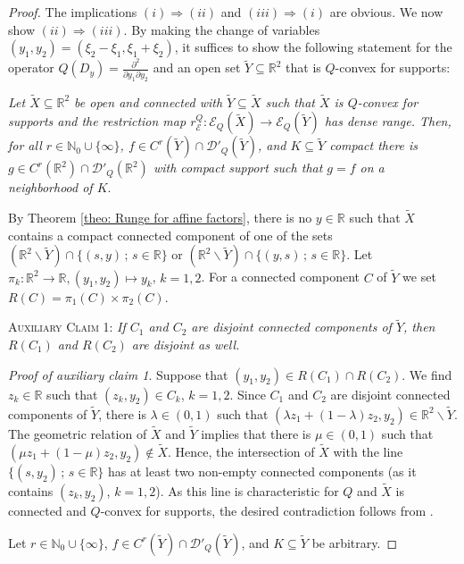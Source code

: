 \documentclass[12pt]{amsart}
\newcommand{\N}{\mathbb{N}}
\newcommand{\R}{\mathbb{R}}
\theoremstyle{definition}
\theoremstyle{remark}
\numberwithin{equation}{section}
\begin{document}
\begin{proof}
The implications $(i) \Rightarrow (ii)$ and $(iii) \Rightarrow (i)$ are obvious. We now show $(ii) \Rightarrow (iii)$. By making the change of variables $(y_1,y_2) = (\xi_2-\xi_1,\xi_1+\xi_2)$, it suffices to show the following statement for the operator $Q(D_y)=\frac{\partial^2}{\partial y_1\partial y_2}$ and an open set $\tilde{Y}\subseteq\R^2$ that is $Q$-convex for supports: 

\emph{Let $\tilde{X} \subseteq \R^2$ be open and connected with $\tilde Y \subseteq \tilde X$  such that $\tilde X$ is $Q$-convex for supports and   the restriction map $r_{\mathscr{E}}^Q:\mathscr{E}_Q(\tilde X)\rightarrow\mathscr{E}_Q(\tilde Y)$ has dense range. Then, for all   $r\in\N_0\cup\{\infty\}$, $f \in C^r(\tilde{Y})\cap\mathscr{D}'_Q(\tilde Y)$,  and $K \subseteq \tilde Y$ compact  there is  $g\in C^r(\R^2)\cap\mathscr{D}'_Q(\R^2)$ with compact support such that $g=f$ on a neighborhood of $K$}.  

By Theorem \ref{theo: Runge for affine factors},  there is no $y\in\R$ such that $\tilde{X}$ contains a compact connected component of one of the sets  $(\R^2\backslash \tilde{Y})\cap\{(s,y) \,; \, s\in\R\}$ or $(\R^2\backslash \tilde{Y})\cap\{(y,s)\, ; \, s\in\R\}$. Let $\pi_k:\R^2\rightarrow\R, (y_1,y_2)\mapsto y_k$, $k=1,2$. For a connected component $C$ of $\tilde{Y}$ we set $R(C)=\pi_1(C)\times\pi_2(C)$.
	
	\textsc{Auxiliary Claim 1:} \emph{If $C_1$ and $C_2$ are disjoint connected components of $\tilde{Y}$, then $R(C_1)$ and $R(C_2)$ are disjoint as well.}
	
	\emph{Proof of auxiliary claim 1}. Suppose that $(y_1,y_2)\in R(C_1)\cap R(C_2)$. We find $z_k\in\R$ such that $(z_k,y_2)\in C_k$, $k = 1,2$. Since $C_1$ and $C_2$ are disjoint connected components of $\tilde Y$, there is $\lambda\in (0,1)$ such that $(\lambda z_1+(1-\lambda)z_2,y_2)\in\R^2\backslash \tilde{Y}$. The geometric relation of $\tilde{X}$ and $\tilde{Y}$ implies that there is $\mu\in (0,1)$ such that $(\mu z_1+(1-\mu)z_2,y_2)\notin\tilde{X}$. Hence, the intersection of $\tilde{X}$ with the line $\{(s,y_2)\, ; \,s\in\R\}$ has at least two non-empty connected components (as it contains $(z_k,y_2)$, $k=1,2$). As this line is characteristic for $Q$ and $\tilde{X}$ is connected and $Q$-convex for supports, the desired contradiction follows from \cite[Theorem 10.8.3]{HoermanderPDO2}. 
	
	Let   $r\in\N_0\cup\{\infty\}$, $f \in C^r(\tilde{Y})\cap\mathscr{D}'_Q(\tilde Y)$,  and $K \subseteq \tilde Y$ be arbitrary.
	

\end{proof}
\end{document}
